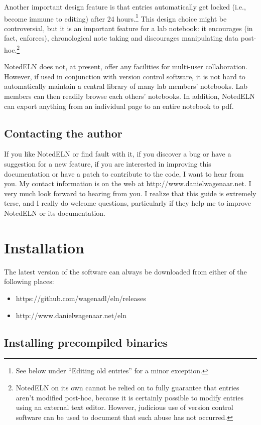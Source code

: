 \documentclass[11pt]{report}
\begin{document}
Another important design feature is that entries automatically get
locked (i.e., become immune to editing) after 24 hours.\footnote{See
  below under ``Editing old entries'' for a minor exception.} This
design choice might be controversial, but it is an important feature
for a lab notebook: it encourages (in fact, enforces), chronological
note taking and discourages manipulating data post-hoc.\footnote{NotedELN
  on its own cannot be relied on to fully guarantee that entries
  aren't modified post-hoc, because it is certainly possible to modify
  entries using an external text editor. However, judicious use of
  version control software can be used to document that such abuse has
  not occurred.}

NotedELN does not, at present, offer any facilities for multi-user
collaboration. However, if used in conjunction with version control
software, it is not hard to automatically maintain a central library of
many lab members' notebooks. Lab members can then readily browse each
others' notebooks. In addition, NotedELN can export anything from an
individual page to an entire notebook to pdf.

\section{Contacting the author}

If you like NotedELN or find fault with it, if you discover a bug or have a
suggestion for a new feature, if you are interested in improving this
documentation or have a patch to contribute to the code, I want to
hear from you. My contact information is on the web at
http://www.danielwagenaar.net. I very much look forward to hearing
from you. I realize that this guide is extremely terse, and I
really do welcome questions, particularly if they help me to improve
NotedELN or its documentation.


\chapter{Installation}

The latest version of the software can always be downloaded from
either of the following places:
\begin{itemize}
\item https://github.com/wagenadl/eln/releases
  \item http://www.danielwagenaar.net/eln
\end{itemize}

\section{Installing precompiled binaries}
\end{document}
